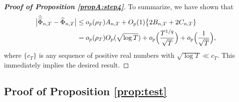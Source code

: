 \begin{proof}[\textnormal{\textbf{Proof of Proposition \ref{propA:step4}}}]
To summarize, we have shown that 
\begin{align*}
\big| \widehat{\widehat{\Phi}}_{n, T} - \widehat{\Phi}_{n, T} \big| 
 & \le o_p( \rho_T) A_{n,T} + O_p(1) \big\{ 2B_{n,T} + 2C_{n,T} \} \\
 & = o_p( \rho_T) O_p(\sqrt{\log T}) + o_p \Big( \frac{T^{1/q}}{\sqrt{T}} \Big) + o_p \Big( \frac{1}{\sqrt{T}} \Big), \
\end{align*}
where $\{c_T\}$ is any sequence of positive real numbers with $\sqrt{\log T} \ll c_T$. This immediately implies the desired result. 
\end{proof}





\subsection*{Proof of Proposition \ref{prop:test}}



